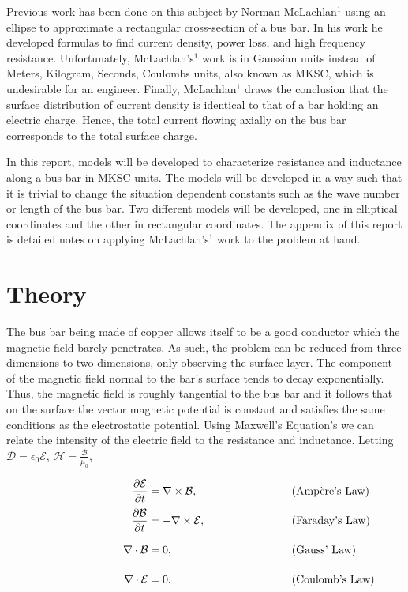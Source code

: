 \documentclass[11pt]{article}
\begin{document}
Previous work has been done on this subject by Norman McLachlan$^1$
using an ellipse to approximate a rectangular cross-section of a bus bar. In his work
he developed formulas to find current density, power loss, and high
frequency resistance. Unfortunately, McLachlan's$^1$ work is in
Gaussian units instead of Meters, Kilogram, Seconds, Coulombs units, also known as MKSC, which is undesirable for an
engineer. Finally, McLachlan$^1$ draws the conclusion that the surface
distribution of current density is identical to that of a bar holding an
electric charge. Hence, the total current flowing axially on the bus bar
corresponds to the total surface charge.

In this report, models will be developed to characterize resistance and inductance
along a bus bar in MKSC units. The models will be developed in a way such that it is trivial to
change the situation dependent constants such as the wave number or length
of the bus bar. Two different models will be developed, one in elliptical coordinates
and the other in rectangular coordinates. The appendix of this report is detailed notes
on applying McLachlan's$^1$ work to the problem at hand.

\section{Theory}

The bus bar being made of copper allows itself to be a good conductor
which the magnetic field barely penetrates. As such, the problem can be
reduced from three dimensions to two dimensions, only observing the
surface layer. The component of the magnetic field normal to the bar's
surface tends to decay exponentially. Thus, the magnetic field is
roughly tangential to the bus bar and it follows that on the surface the
vector magnetic potential is constant and satisfies the same conditions
as the electrostatic potential. Using Maxwell's Equation's we can relate
the intensity of the electric field to the resistance and inductance.
Letting $\mathcal D = \epsilon _0 \mathcal E$, $\mathcal H = \frac{\mathcal B}{\mu _0}$, 

\begin{equation}
	\begin{alignedat}{3}
		& \hskip8em & \frac{\partial \mathcal{E}}{\partial t}& = \nabla \times \mathcal{B}, & \hskip8em &\text{(Ampère's Law)} \\[0.5ex]
		& & \frac{\partial\mathcal{B}}{\partial t}& = -\nabla \times \mathcal{E}, & &\text{(Faraday's Law)} \\[0.5ex]
		&\vphantom{\frac{\partial B}{\partial t}} &\nabla \cdot \mathcal{B} & =0, & &\text{(Gauss' Law)} \\[0.5ex]
		&\vphantom{\frac{\partial B}{\partial t}} &\nabla \cdot \mathcal{E} & =0. & &\text{(Coulomb's Law)}
	\end{alignedat}
\end{equation}
\end{document}
